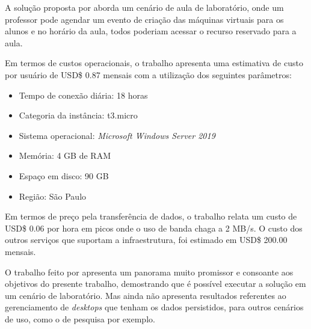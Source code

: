 A solução proposta por \citet{edufirestick} aborda um cenário de aula de laboratório, onde um professor pode agendar um evento de criação das máquinas virtuais para os alunos e no horário da aula, todos poderiam acessar o recurso reservado para a aula.

Em termos de custos operacionais, o trabalho apresenta uma estimativa de custo por usuário de USD\$ 0.87 mensais com a utilização dos seguintes parâmetros:

\begin{itemize}
    \item Tempo de conexão diária: 18 horas
    \item Categoria da instância: t3.micro
    \item Sistema operacional: \textit{Microsoft Windows Server 2019}
    \item Memória: 4 GB de RAM
    \item Espaço em disco: 90 GB
    \item Região: São Paulo
\end{itemize}

Em termos de preço pela transferência de dados, o trabalho relata um custo de USD\$ 0.06 por hora em picos onde o uso de banda chaga a 2 MB/s. O custo dos outros serviços que suportam a infraestrutura, foi estimado em USD\$ 200.00 mensais.

O trabalho feito por \citet{edufirestick} apresenta um panorama muito promissor e consoante aos objetivos do presente trabalho, demostrando que é possível executar a solução em um cenário de laboratório. Mas ainda não apresenta resultados referentes ao gerenciamento de \textit{desktops} que tenham os dados persistidos, para outros cenários de uso, como o de pesquisa por exemplo.